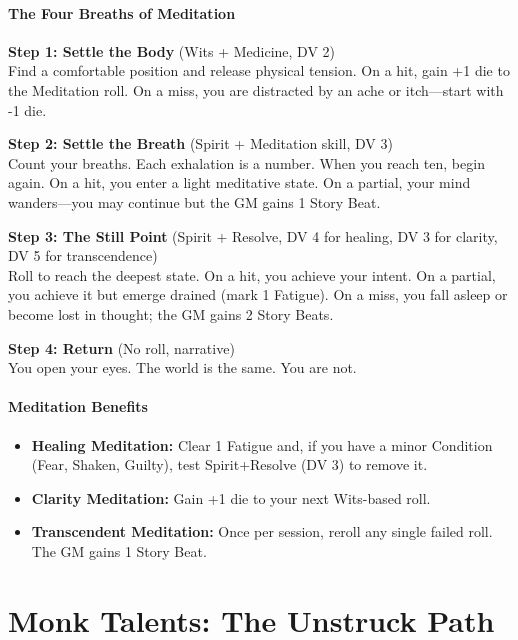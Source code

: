 \documentclass[11pt]{book}
\begin{document}
\subsection{The Four Breaths of Meditation}

\textbf{Step 1: Settle the Body} (Wits + Medicine, DV 2) \\
Find a comfortable position and release physical tension. On a hit, gain +1 die to the Meditation roll. On a miss, you are distracted by an ache or itch---start with -1 die.

\textbf{Step 2: Settle the Breath} (Spirit + Meditation skill, DV 3) \\
Count your breaths. Each exhalation is a number. When you reach ten, begin again. On a hit, you enter a light meditative state. On a partial, your mind wanders---you may continue but the GM gains 1 Story Beat.

\textbf{Step 3: The Still Point} (Spirit + Resolve, DV 4 for healing, DV 3 for clarity, DV 5 for transcendence) \\
Roll to reach the deepest state. On a hit, you achieve your intent. On a partial, you achieve it but emerge drained (mark 1 Fatigue). On a miss, you fall asleep or become lost in thought; the GM gains 2 Story Beats.

\textbf{Step 4: Return} (No roll, narrative) \\
You open your eyes. The world is the same. You are not.

\subsection{Meditation Benefits}

\begin{itemize}
    \item \textbf{Healing Meditation:} Clear 1 Fatigue and, if you have a minor Condition (Fear, Shaken, Guilty), test Spirit+Resolve (DV 3) to remove it.
    \item \textbf{Clarity Meditation:} Gain +1 die to your next Wits-based roll.
    \item \textbf{Transcendent Meditation:} Once per session, reroll any single failed roll. The GM gains 1 Story Beat.
\end{itemize}

\part{Monk Talents: The Unstruck Path}
\end{document}
